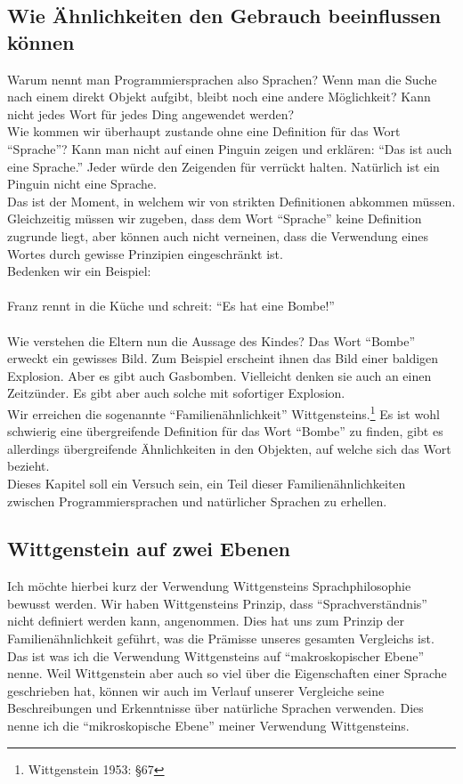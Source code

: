 \documentclass[a4paper,10pt]{article}
\begin{document}
\subsection{Wie Ähnlichkeiten den Gebrauch beeinflussen können}
Warum nennt man Programmiersprachen also Sprachen? Wenn man die Suche nach einem direkt Objekt aufgibt, bleibt noch eine andere Möglichkeit? Kann nicht jedes Wort für jedes Ding angewendet werden? \\
Wie kommen wir überhaupt zustande ohne eine Definition für das Wort \enquote{Sprache}? Kann man nicht auf einen Pinguin zeigen und erklären: \enquote{Das ist auch eine Sprache.} Jeder würde den Zeigenden für verrückt halten. Natürlich ist ein Pinguin nicht eine Sprache. \\
Das ist der Moment, in welchem wir von strikten Definitionen abkommen müssen. Gleichzeitig müssen wir zugeben, dass dem Wort \enquote{Sprache} keine Definition zugrunde liegt, aber können auch nicht verneinen, dass die Verwendung eines Wortes durch gewisse Prinzipien eingeschränkt ist. \\
Bedenken wir ein Beispiel: \\
\\
Franz rennt in die Küche und schreit: \enquote{Es hat eine Bombe!} \\
\\
Wie verstehen die Eltern nun die Aussage des Kindes? Das Wort \enquote{Bombe} erweckt ein gewisses Bild. Zum Beispiel erscheint ihnen das Bild einer baldigen Explosion. Aber es gibt auch Gasbomben. Vielleicht denken sie auch an einen Zeitzünder. Es gibt aber auch solche mit sofortiger Explosion. \\
Wir erreichen die sogenannte \enquote{Familienähnlichkeit} Wittgensteins.\footnote{Wittgenstein 1953: §67} Es ist wohl schwierig eine übergreifende Definition für das Wort \enquote{Bombe} zu finden, gibt es allerdings übergreifende Ähnlichkeiten in den Objekten, auf welche sich das Wort bezieht. \\
Dieses Kapitel soll ein Versuch sein, ein Teil dieser Familienähnlichkeiten zwischen Programmiersprachen und natürlicher Sprachen zu erhellen.

\subsection{Wittgenstein auf zwei Ebenen}
Ich möchte hierbei kurz der Verwendung Wittgensteins Sprachphilosophie bewusst werden. Wir haben Wittgensteins Prinzip, dass \enquote{Sprachverständnis} nicht definiert werden kann, angenommen. Dies hat uns zum Prinzip der Familienähnlichkeit geführt, was die Prämisse unseres gesamten Vergleichs ist. Das ist was ich die Verwendung Wittgensteins auf \enquote{makroskopischer Ebene} nenne.
Weil Wittgenstein aber auch so viel über die Eigenschaften einer Sprache geschrieben hat, können wir auch im Verlauf unserer Vergleiche seine Beschreibungen und Erkenntnisse über natürliche Sprachen verwenden. Dies nenne ich die \enquote{mikroskopische Ebene} meiner Verwendung Wittgensteins.
\end{document}
